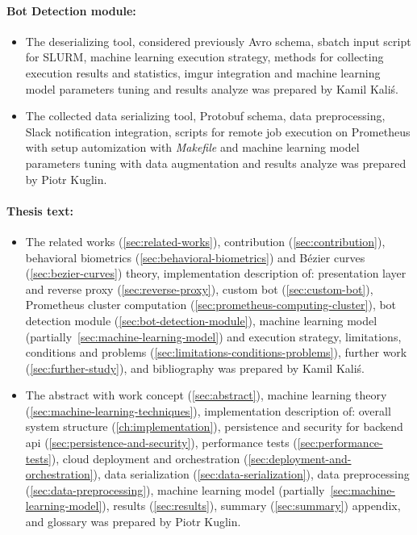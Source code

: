 \begin{minipage}{\textwidth}
    \paragraph{Bot Detection module:}
    \begin{itemize}[label=$\bullet$]
        \item The deserializing tool, considered previously Avro schema, sbatch input script for SLURM, machine learning execution strategy, methods for collecting execution results and statistics, imgur integration and machine learning model parameters tuning and results analyze was prepared by Kamil Kaliś.
        \item The collected data serializing tool, Protobuf schema, data preprocessing, Slack notification integration, scripts for remote job execution on Prometheus with setup automization with \textit{Makefile} and machine learning model parameters tuning with data augmentation and results analyze was prepared by Piotr Kuglin.
    \end{itemize}
\end{minipage}

\begin{minipage}{\textwidth}
    \paragraph{Thesis text:}
    \begin{itemize}[label=$\bullet$]
        \item The related works (\ref{sec:related-works}), contribution (\ref{sec:contribution}), behavioral biometrics (\ref{sec:behavioral-biometrics}) and Bézier curves (\ref{sec:bezier-curves}) theory, implementation description of: presentation layer and reverse proxy (\ref{sec:reverse-proxy}), custom bot (\ref{sec:custom-bot}), Prometheus cluster computation (\ref{sec:prometheus-computing-cluster}), bot detection module (\ref{sec:bot-detection-module}), machine learning model (partially~\ref{sec:machine-learning-model}) and execution strategy, limitations, conditions and problems (\ref{sec:limitations-conditions-problems}), further work (\ref{sec:further-study}), and bibliography was prepared by Kamil Kaliś.
        \item The abstract with work concept (\ref{sec:abstract}), machine learning theory (\ref{sec:machine-learning-techniques}), implementation description of: overall system structure (\ref{ch:implementation}), persistence and security for backend \gls{api} (\ref{sec:persistence-and-security}), performance tests (\ref{sec:performance-tests}), cloud deployment and orchestration (\ref{sec:deployment-and-orchestration}), data serialization (\ref{sec:data-serialization}), data preprocessing (\ref{sec:data-preprocessing}), machine learning model (partially~\ref{sec:machine-learning-model}), results (\ref{sec:results}), summary (\ref{sec:summary}) appendix, and glossary was prepared by Piotr Kuglin.
    \end{itemize}
\end{minipage}
